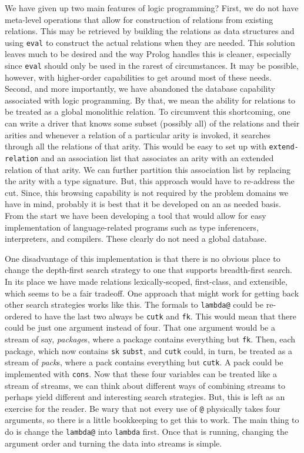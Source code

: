 We have given up two main features of logic programming?  First, we do
not have meta-level operations that allow for construction of relations
from existing relations.  This may be retrieved by building the relations
as data structures and using \texttt{eval} to construct the actual
relations when they are needed.  This solution leaves much to be
desired and the way Prolog handles this is cleaner, especially since
\texttt{eval} should only be used in the rarest of circumstances.  It
may be possible, however, with higher-order capabilities to get
around most of these needs.  Second, and more importantly, we have
abandoned the database capability associated with logic
programming. By that, we mean the ability for relations to be
treated as a global monolithic relation.  To circumvent this
shortcoming, one can write a driver that knows some subset (possibly
all) of the relations and their arities and whenever a relation of a
particular arity is invoked, it searches through all the relations of
that arity.  This would be easy to set up with
\texttt{extend-relation} and an association list that associates an
arity with an extended relation of that arity. We can further
partition this association list by replacing the arity with a type
signature.  But, this approach would have to re-address the cut.
Since, this browsing capability is not required by the problem domains
we have in mind, probably it is best that it be developed on an as
needed basis.  From the start we have been developing a tool that
would allow for easy implementation of language-related programs such
as type inferencers, interpreters, and compilers.  These clearly do
not need a global database.

One disadvantage of this implementation is that there is no obvious
place to change the depth-first search strategy to one that supports
breadth-first search.  In its place we have made relations
lexically-scoped, first-class, and extensible, which seems to be a
fair tradeoff.  One approach that might work for getting back other
search strategies works like this.  The formals to \texttt{lambda@}
could be re-ordered to have the last two always be \texttt{cutk} and
\texttt{fk}.  This would mean that there could be just one argument
instead of four.  That one argument would be a stream of say,
\emph{package}s, where a package contains everything but \texttt{fk}.
Then, each package, which now contains \texttt{sk} \texttt{subst}, and
\texttt{cutk} could, in turn, be treated as a stream of \emph{pack}s,
where a pack contains everything but \texttt{cutk}.  A pack could be
implemented with \texttt{cons}.  Now that these four variables can be
treated like a stream of streams, we can think about different ways of
combining streams to perhaps yield different and interesting search
strategies.  But, this is left as an exercise for the reader.  Be wary
that not every use of \texttt{@} physically takes four arguments, so
there is a little bookkeeping to get this to work.  The main thing to
do is change the \texttt{lambda@} into \texttt{lambda} first.  Once
that is running, changing the argument order and turning the data into
streams is simple.

